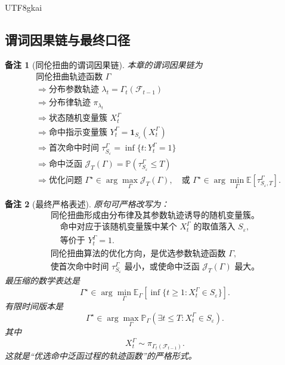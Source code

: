 \documentclass[12pt]{article}
\newtheorem{remark}{备注}[section]
\begin{document}
\begin{CJK*}{UTF8}{gkai}
\subsection{谓词因果链与最终口径}
\label{subsec:tex55-homtwist-predicate-chain}

\begin{remark}[同伦扭曲的谓词因果链]
本章的谓词因果链为
\[
\begin{aligned}
  &\text{同伦扭曲轨迹函数 }\Gamma\\
  &\Longrightarrow
  \text{分布参数轨迹 }\lambda_t=\Gamma_t(\mathcal F_{t-1})\\
  &\Longrightarrow
  \text{分布律轨迹 }\pi_{\lambda_t}\\
  &\Longrightarrow
  \text{状态随机变量簇 }X_t^\Gamma\\
  &\Longrightarrow
  \text{命中指示变量簇 }
  Y_t^\Gamma=\mathbf 1_{S_\varepsilon}(X_t^\Gamma)\\
  &\Longrightarrow
  \text{首次命中时间 }
  \tau_{S_\varepsilon}^\Gamma=\inf\{t:Y_t^\Gamma=1\}\\
  &\Longrightarrow
  \text{命中泛函 }
  \mathcal J_T(\Gamma)=
  \mathbb P(\tau_{S_\varepsilon}^\Gamma\le T)\\
  &\Longrightarrow
  \text{优化问题 }
  \Gamma^\star\in\arg\max_\Gamma\mathcal J_T(\Gamma),
  \quad
  \text{或 }
  \Gamma^\star\in
  \arg\min_\Gamma\mathbb E[\tau_{S_\varepsilon,T}^\Gamma].
\end{aligned}
\]
\end{remark}

\begin{remark}[最终严格表述]
原句可严格改写为：
\[
  \boxed{
  \text{同伦扭曲形成由分布律及其参数轨迹诱导的随机变量簇。}
  }
\]
\[
  \boxed{
  \begin{gathered}
  \text{命中对应于该随机变量簇中某个 }X_t^\Gamma\text{ 的取值落入 }S_\varepsilon,\\
  \text{等价于 }Y_t^\Gamma=1.
  \end{gathered}
  }
\]
\[
  \boxed{
  \begin{gathered}
  \text{同伦扭曲算法的优化方向，是优选参数轨迹函数 }\Gamma,\\
  \text{使首次命中时间 }\tau_{S_\varepsilon}^\Gamma\text{ 最小，或使命中泛函 }\mathcal J_T(\Gamma)\text{ 最大。}
  \end{gathered}
  }
\]
最压缩的数学表达是
\[
  \boxed{
  \Gamma^\star
  \in
  \arg\min_{\Gamma}
  \mathbb E_\Gamma
  \left[
  \inf\{t\ge1:X_t^\Gamma\in S_\varepsilon\}
  \right].
  }
\]
有限时间版本是
\[
  \boxed{
  \Gamma^\star
  \in
  \arg\max_{\Gamma}
  \mathbb P_\Gamma
  \left(
  \exists t\le T:
  X_t^\Gamma\in S_\varepsilon
  \right).
  }
\]
其中
\[
  X_t^\Gamma\sim\pi_{\Gamma_t(\mathcal F_{t-1})}.
\]
这就是“优选命中泛函过程的轨迹函数”的严格形式。
\end{remark}


\end{CJK*}
\end{document}
